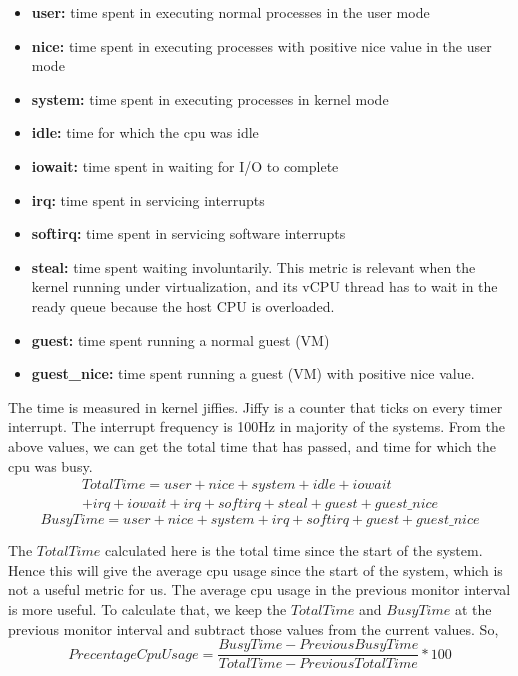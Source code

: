 \begin{itemize}
\item \textbf{user:} time spent in executing normal processes in the user mode
\item \textbf{nice:} time spent in executing processes with positive nice value in the user mode
\item \textbf{system:} time spent in executing processes in kernel mode
\item \textbf{idle:} time for which the cpu was idle
\item \textbf{iowait:} time spent in waiting for I/O to complete
\item \textbf{irq:} time spent in servicing interrupts
\item \textbf{softirq:} time spent in servicing software interrupts
\item \textbf{steal:} time spent waiting involuntarily. This metric is relevant when the kernel running under virtualization, and its vCPU thread has to wait in the ready queue because the host CPU is overloaded.
\item \textbf{guest:} time spent running a normal guest (VM)
\item \textbf{guest\_nice:} time spent running a guest (VM) with positive nice value.
\end{itemize}
The time is measured in kernel jiffies. Jiffy is a counter that ticks on every timer interrupt. The interrupt frequency is 100Hz in majority of the systems.
From the above values, we can get the total time that has passed, and time for which the cpu was busy.
\begin{multline*}
 Total Time = user + nice + system + idle + iowait \\ + irq + iowait + irq + softirq + steal + guest + guest\_nice
\end{multline*}
$$ Busy Time = user + nice + system + irq + softirq + guest + guest\_nice$$

The $Total Time$ calculated here is the total time since the start of the system. Hence this will give the average cpu usage since the start of the system, which is not a useful metric for us. The average cpu usage in the previous monitor interval is more useful. To calculate that, we keep the $Total Time$ and $Busy Time$ at the previous monitor interval and subtract those values from the current values. So, 
$$
PrecentageCpuUsage = \frac{Busy Time - Previous Busy Time}{Total Time - Previous Total Time}*100$$

